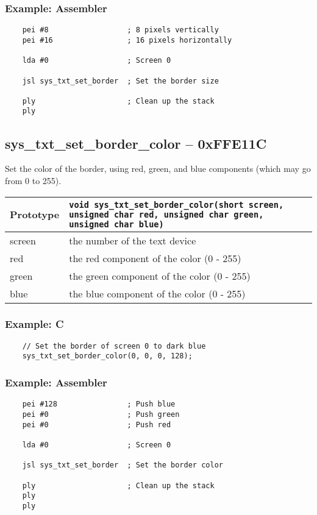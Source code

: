 \subsubsection*{Example: Assembler}
\begin{verbatim}
    pei #8                  ; 8 pixels vertically
    pei #16                 ; 16 pixels horizontally

    lda #0                  ; Screen 0

    jsl sys_txt_set_border  ; Set the border size

    ply                     ; Clean up the stack
    ply
\end{verbatim}


\subsection*{sys\_txt\_set\_border\_color -- 0xFFE11C}
Set the color of the border, using red, green, and blue components (which may go from 0 to 255).

\bigskip

\begin{tabular}{|l||l|} \hline
Prototype & \lstinline!void sys_txt_set_border_color(short screen, unsigned char red, unsigned char green, unsigned char blue)! \\ \hline
screen & the number of the text device \\ \hline
red & the red component of the color (0 - 255) \\ \hline
green & the green component of the color (0 - 255) \\ \hline
blue & the blue component of the color (0 - 255) \\ \hline
\end{tabular}

\subsubsection*{Example: C}
\begin{lstlisting}
    // Set the border of screen 0 to dark blue
    sys_txt_set_border_color(0, 0, 0, 128);
\end{lstlisting}

\subsubsection*{Example: Assembler}
\begin{verbatim}
    pei #128                ; Push blue
    pei #0                  ; Push green
    pei #0                  ; Push red

    lda #0                  ; Screen 0

    jsl sys_txt_set_border  ; Set the border color

    ply                     ; Clean up the stack
    ply
    ply
\end{verbatim}

